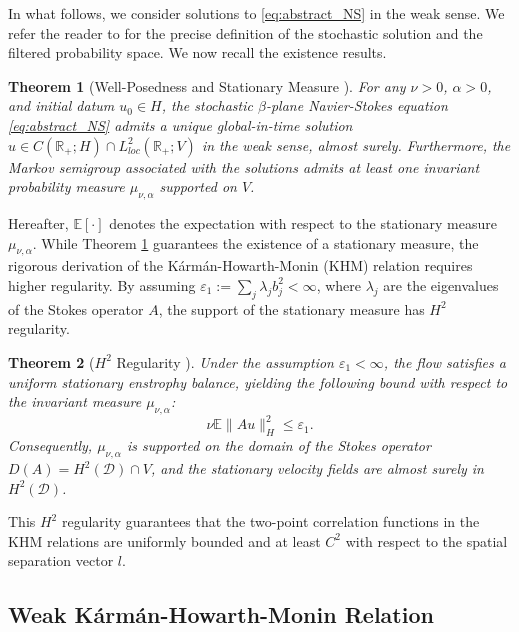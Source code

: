 \documentclass[11pt,a4paper]{article}
\numberwithin{equation}{section}
\newtheorem{theorem}{Theorem}%
\numberwithin{theorem}{section}
\numberwithin{remark}{section}
\numberwithin{definition}{section}
\begin{document}
In what follows, we consider solutions to \eqref{eq:abstract_NS} in the weak sense. We refer the reader to \cite{yuriamiraligigliolaWP} for the precise definition of the stochastic solution and the filtered probability space. We now recall the existence results.

\begin{theorem}[Well-Posedness and Stationary Measure \cite{yuriamiraligigliolaWP}]\label{thm:stationary_measure}
For any $\nu > 0$, $\alpha > 0$, and initial datum $u_0 \in H$, the stochastic $\beta$-plane Navier-Stokes equation \eqref{eq:abstract_NS} admits a unique global-in-time solution $u \in C(\mathbb{R}_+; H) \cap L^2_{loc}(\mathbb{R}_+; V)$ in the weak sense, almost surely. Furthermore, the Markov semigroup associated with the solutions admits at least one invariant probability measure $\mu_{\nu,\alpha}$ supported on $V$.
\end{theorem}
Hereafter, $\mathbb{E}[\cdot]$ denotes the expectation with respect to the stationary measure $\mu_{\nu,\alpha}$. While Theorem \ref{thm:stationary_measure} guarantees the existence of a stationary measure, the rigorous derivation of the Kármán-Howarth-Monin (KHM) relation requires higher regularity. By assuming $\varepsilon_1 := \sum_j \lambda_j b_j^2 < \infty$, where $\lambda_j$ are the eigenvalues of the Stokes operator $A$, the support of the stationary measure has $H^2$ regularity.

\begin{theorem}[$H^2$ Regularity \cite{yuriamiraligigliolaWP}]\label{thm:H2_regularity}
Under the assumption $\varepsilon_1 < \infty$, the flow satisfies a uniform stationary enstrophy balance, yielding the following bound with respect to the invariant measure $\mu_{\nu,\alpha}$:
\begin{equation}\label{eq:H2_bound}
    \nu \mathbb{E} \|A u\|_{H}^2 \le \varepsilon_1.
\end{equation}
Consequently, $\mu_{\nu,\alpha}$ is supported on the domain of the Stokes operator $D(A) = H^2(\mathcal{D}) \cap V$, and the stationary velocity fields are almost surely in $H^2(\mathcal{D})$.
\end{theorem}
This $H^2$ regularity guarantees that the two-point correlation functions in the KHM relations are uniformly bounded and at least $C^2$ with respect to the spatial separation vector $l$.



\subsection{Weak Kármán-Howarth-Monin Relation}\label{sec:weak_khm}
\end{document}
